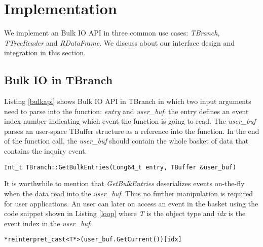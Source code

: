 \section{Implementation}
\label{sec:implementation}

We implement an Bulk IO API in three common use cases: \textit{TBranch}, \textit{TTreeReader} and \textit{RDataFrame}. We discuss about our interface design and integration in this section.

\subsection{Bulk IO in TBranch}

Listing \ref{bulkapi} shows Bulk IO API in TBranch in which two input arguments need to parse into the function: \textit{entry} and \textit{user\_buf}. the entry defines an event index number indicating which event the function is going to read. The \textit{user\_buf} parses an user-space TBuffer structure as a reference into the function. In the end of the function call, the \textit{user\_buf} should contain the whole basket of data that contains the inquiry event.


\vspace{5pt}
\begin{lstlisting}[caption={Bulk API in TBranch},captionpos=b,label={bulkapi}]
Int_t TBranch::GetBulkEntries(Long64_t entry, TBuffer &user_buf)
\end{lstlisting}

It is worthwhile to mention that \textit{GetBulkEntries} deserializes events on-the-fly when the data read into the \textit{user\_buf}. Thus no further manipulation is required for user applications. An user can later on access an event in the basket using the code snippet shown in Listing \ref{loop} where \textit{T} is the object type and \textit{idx} is the event index in the \textit{user\_buf}.
\vspace{5pt}
\lstset{basicstyle=\ttfamily,xleftmargin=0.1\textwidth,xrightmargin=0.05\textwidth}
\begin{lstlisting}[caption={Loop over user\_buf.},captionpos=b,label={loop}]
*reinterpret_cast<T*>(user_buf.GetCurrent())[idx]
\end{lstlisting}

